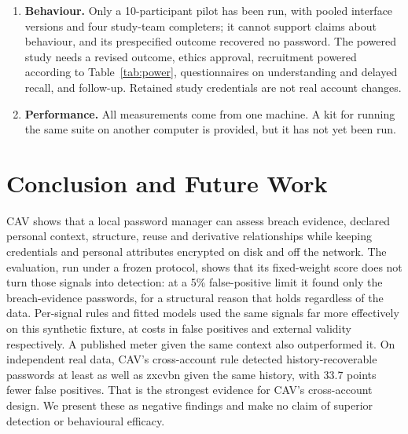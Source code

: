 \documentclass[preprint,12pt]{elsarticle}
\begin{document}
\begin{enumerate}
\item \textbf{Behaviour.} Only a 10-participant pilot has been run, with pooled interface versions and four study-team completers; it cannot support claims about behaviour, and its prespecified outcome recovered no password. The powered study needs a revised outcome, ethics approval, recruitment powered according to Table~\ref{tab:power}, questionnaires on understanding and delayed recall, and follow-up. Retained study credentials are not real account changes.
\item \textbf{Performance.} All measurements come from one machine. A kit for running the same suite on another computer is provided, but it has not yet been run.
\end{enumerate}

\section{Conclusion and Future Work}
CAV shows that a local password manager can assess breach evidence, declared personal context, structure, reuse and derivative relationships while keeping credentials and personal attributes encrypted on disk and off the network. The evaluation, run under a frozen protocol, shows that its fixed-weight score does not turn those signals into detection: at a 5\% false-positive limit it found only the breach-evidence passwords, for a structural reason that holds regardless of the data. Per-signal rules and fitted models used the same signals far more effectively on this synthetic fixture, at costs in false positives and external validity respectively. A published meter given the same context also outperformed it. On independent real data, CAV's cross-account rule detected history-recoverable passwords at least as well as zxcvbn given the same history, with 33.7 points fewer false positives. That is the strongest evidence for CAV's cross-account design. We present these as negative findings and make no claim of superior detection or behavioural efficacy.
\end{document}

